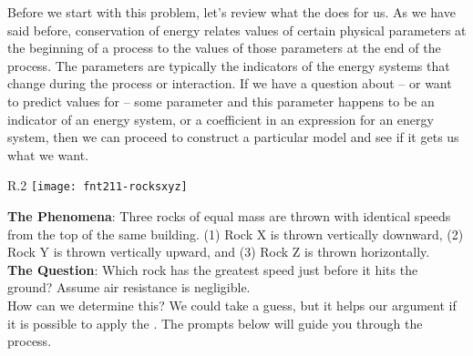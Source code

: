 Before we start with this problem, let's review what the \EnergyInteractionModel{} does for us. As we have said before, conservation of energy relates values of certain physical parameters at the beginning of a process to the values of those parameters at the end of the process. The parameters are typically the indicators of the energy systems that change during the process or interaction. If we have a question about -- or want to predict values for -- some parameter and this parameter happens to be an indicator of an energy system, or a coefficient in an expression for an energy system, then we can proceed to construct a particular model and see if it gets us what we want.\\

\begin{wrapfigure}{R}{.2\textwidth}
	\centering
	\texttt{[image: fnt211-rocksxyz]}	
\end{wrapfigure}

\label{fnt2.1.1-1}

\noindent\textbf{The Phenomena}: Three rocks of equal mass are thrown with identical speeds from the top of the same building. (1) Rock X is thrown vertically downward, (2) Rock Y is thrown vertically upward, and (3) Rock Z is thrown horizontally.\\

\noindent\textbf{The Question}: Which rock has the greatest speed just before it hits the ground? Assume air resistance is negligible.\\

\noindent How can we determine this? We could take a guess, but it helps our argument if it is possible to apply the \EnergyInteractionModel{}. The prompts below will guide you through the process.


